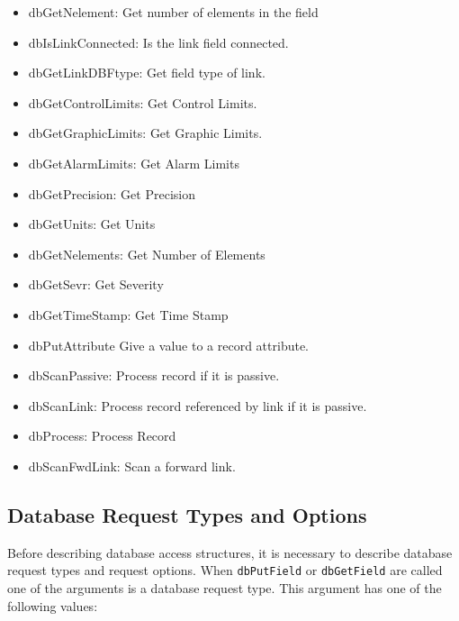 \begin{itemize}
\item dbGetNelement: Get number of elements in the field

\item dbIsLinkConnected: Is the link field connected.

\item dbGetLinkDBFtype: Get field type of link.

\item dbGetControlLimits: Get Control Limits.

\item dbGetGraphicLimits: Get Graphic Limits.

\item dbGetAlarmLimits: Get Alarm Limits

\item dbGetPrecision: Get Precision

\item dbGetUnits: Get Units

\item dbGetNelements: Get Number of Elements

\item dbGetSevr: Get Severity

\item dbGetTimeStamp: Get Time Stamp

\item dbPutAttribute Give a value to a record attribute.

\item dbScanPassive: Process record if it is passive.

\item dbScanLink: Process record referenced by link if it is passive.

\item dbProcess: Process Record

\item dbScanFwdLink: Scan a forward link.

\end{itemize}

\subsection{Database Request Types and Options}

Before describing database access structures, it is necessary to describe database request types and request options.
When \verb|dbPutField| or \verb|dbGetField| are called one of the arguments is a database request type.
This argument has one of the following values: 

